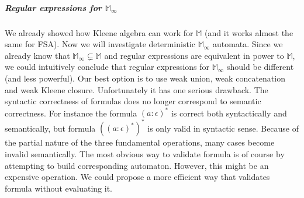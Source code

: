 \documentclass[12pt]{article}
\begin{document}
\subparagraph{Regular expressions for $\mathbb{ M}_\infty$} We already showed how Kleene algebra can work for $\mathbb{ M}$ (and it works almost the same for FSA). Now we will investigate deterministic $\mathbb{ M}_\infty$ automata. Since we already know that $\mathbb{ M}_\infty \subsetneq \mathbb{ M}$ and regular expressions are equivalent in power to $\mathbb{ M}$, we could intuitively conclude that regular expressions for $\mathbb{ M}_\infty$ should be different (and less powerful). Our best option is to use weak union, weak concatenation and weak Kleene closure. Unfortunately it has one serious drawback. The syntactic correctness of formulas does no longer correspond to semantic correctness. For instance the formula $(a:\epsilon)^*$ is correct both syntactically and semantically, but formula $((a:\epsilon)^*)^*$ is only valid in syntactic sense. Because of the partial nature of the three fundamental operations, many cases become invalid semantically. The most obvious way to validate formula is of course by attempting to build corresponding automaton. However, this might be an expensive operation. We could propose a more efficient way that validates formula without evaluating it.
\end{document}
